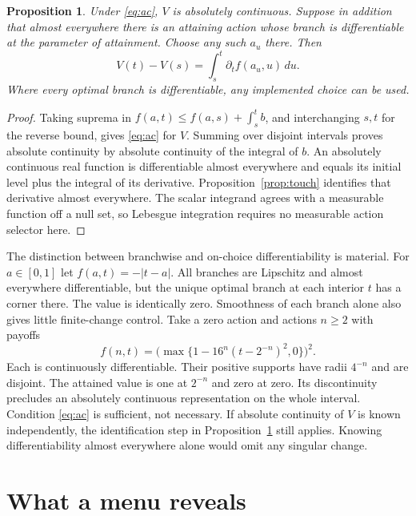 \documentclass[11pt]{article}
\newtheorem{proposition}{Proposition}
\begin{document}
\begin{proposition}\label{prop:int}
Under \eqref{eq:ac}, $V$ is absolutely continuous. Suppose in addition that almost everywhere there is an attaining action whose branch is differentiable at the parameter of attainment. Choose any such $a_u$ there. Then
\begin{equation}\label{eq:int}
 V(t)-V(s)=\int_s^t \partial_t f(a_u,u)\,du .
\end{equation}
Where every optimal branch is differentiable, any implemented choice can be used.
\end{proposition}
\begin{proof}
Taking suprema in $f(a,t)\le f(a,s)+\int_s^t b$, and interchanging $s,t$ for the reverse bound, gives \eqref{eq:ac} for $V$. Summing over disjoint intervals proves absolute continuity by absolute continuity of the integral of $b$. An absolutely continuous real function is differentiable almost everywhere and equals its initial level plus the integral of its derivative. Proposition~\ref{prop:touch} identifies that derivative almost everywhere. The scalar integrand agrees with a measurable function off a null set, so Lebesgue integration requires no measurable action selector here.
\end{proof}

The distinction between branchwise and on-choice differentiability is material. For $a\in[0,1]$ let $f(a,t)=-|t-a|$. All branches are Lipschitz and almost everywhere differentiable, but the unique optimal branch at each interior $t$ has a corner there. The value is identically zero. Smoothness of each branch alone also gives little finite-change control. Take a zero action and actions $n\ge2$ with payoffs
\[
 f(n,t)=\bigl(\max\{1-16^n(t-2^{-n})^2,0\}\bigr)^2 .
\]
Each is continuously differentiable. Their positive supports have radii $4^{-n}$ and are disjoint. The attained value is one at $2^{-n}$ and zero at zero. Its discontinuity precludes an absolutely continuous representation on the whole interval. Condition \eqref{eq:ac} is sufficient, not necessary. If absolute continuity of $V$ is known independently, the identification step in Proposition~\ref{prop:int} still applies. Knowing differentiability almost everywhere alone would omit any singular change.

\section{What a menu reveals}\label{sec:menu}
\end{document}
